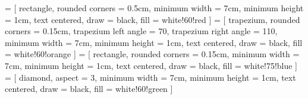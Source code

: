 \usetikzlibrary{calc,intersections,backgrounds,automata,positioning,patterns}
\usetikzlibrary{decorations,shapes.misc,shapes.geometric,arrows}
 = [
    rectangle,
    rounded corners = 0.5cm,
    minimum width = 7cm,
    minimum height = 1cm,
    text centered,
    draw = black,
    fill = white!60!red
]
 = [
    trapezium,
    rounded corners = 0.15cm,
    trapezium left angle = 70,
    trapezium right angle = 110,
    minimum width = 7cm,
    minimum height = 1cm,
    text centered,
    draw = black,
    fill = white!60!orange
]
 = [
    rectangle,
    rounded corners = 0.15cm,
    minimum width = 7cm,
    minimum height = 1cm,
    text centered,
    draw = black,
    fill = white!75!blue
]
 = [
    diamond,
    aspect = 3,
    minimum width = 7cm,
    minimum height = 1cm,
    text centered,
    draw = black,
    fill = white!60!green
]

\hypersetup{
    colorlinks     = true,
    linkcolor      = bluecite, 
	citecolor      = bluecite, 
	urlcolor       = bluecite,
	linktoc        = none
}

\hypersetup{
    colorlinks     = true,
    linkcolor      = bluecite, 
	citecolor      = bluecite, 
	urlcolor       = bluecite,
	linktoc        = none
}